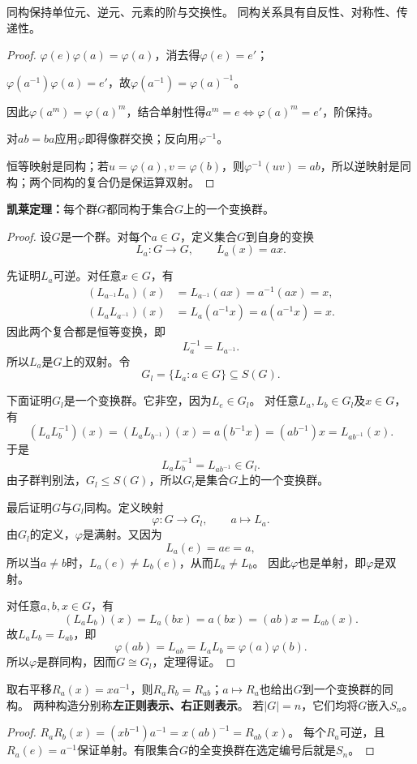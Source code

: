 \begin{proposition}
同构保持单位元、逆元、元素的阶与交换性。
同构关系具有自反性、对称性、传递性。
\end{proposition}
\begin{proof}
$\varphi(e)\varphi(a)=\varphi(a)$，消去得$\varphi(e)=e'$；

$\varphi(a^{-1})\varphi(a)=e'$，故$\varphi(a^{-1})=\varphi(a)^{-1}$。

因此$\varphi(a^m)=\varphi(a)^m$，结合单射性得$a^m=e\iff\varphi(a)^m=e'$，阶保持。

对$ab=ba$应用$\varphi$即得像群交换；反向用$\varphi^{-1}$。

恒等映射是同构；若$u=\varphi(a),v=\varphi(b)$，则$\varphi^{-1}(uv)=ab$，所以逆映射是同构；两个同构的复合仍是保运算双射。
\end{proof}
\begin{theorem}
\textbf{凯莱定理：}每个群$G$都同构于集合$G$上的一个变换群。
\end{theorem}
\begin{proof}
设$G$是一个群。对每个$a\in G$，定义集合$G$到自身的变换
\[
L_a:G\longrightarrow G,\qquad L_a(x)=ax.
\]

先证明$L_a$可逆。对任意$x\in G$，有
\[
\begin{aligned}
(L_{a^{-1}}L_a)(x)
&=L_{a^{-1}}(ax)
=a^{-1}(ax)
=x,\\
(L_aL_{a^{-1}})(x)
&=L_a(a^{-1}x)
=a(a^{-1}x)
=x.
\end{aligned}
\]
因此两个复合都是恒等变换，即
\[
L_a^{-1}=L_{a^{-1}}.
\]
所以$L_a$是$G$上的双射。令
\[
G_l=\{L_a:a\in G\}\subseteq S(G).
\]

下面证明$G_l$是一个变换群。它非空，因为$L_e\in G_l$。
对任意$L_a,L_b\in G_l$及$x\in G$，有
\[(L_aL_b^{-1})(x)
=(L_aL_{b^{-1}})(x)=a(b^{-1}x)=(ab^{-1})x=L_{ab^{-1}}(x).\]
于是
\[
L_aL_b^{-1}=L_{ab^{-1}}\in G_l.
\]
由子群判别法，$G_l\leq S(G)$，所以$G_l$是集合$G$上的一个变换群。

最后证明$G$与$G_l$同构。定义映射
\[
\varphi:G\longrightarrow G_l,\qquad a\longmapsto L_a.
\]
由$G_l$的定义，$\varphi$是满射。又因为
\[
L_a(e)=ae=a,
\]
所以当$a\neq b$时，$L_a(e)\neq L_b(e)$，从而$L_a\neq L_b$。
因此$\varphi$也是单射，即$\varphi$是双射。

对任意$a,b,x\in G$，有
\[(L_aL_b)(x)=L_a(bx)=a(bx)=(ab)x=L_{ab}(x).\]
故$L_aL_b=L_{ab}$，即
\[
\varphi(ab)=L_{ab}=L_aL_b=\varphi(a)\varphi(b).
\]
所以$\varphi$是群同构，因而$G\cong G_l$，定理得证。
\end{proof}

\begin{proposition}
取右平移$R_a(x)=xa^{-1}$，则$R_aR_b=R_{ab}$；$a\mapsto R_a$也给出$G$到一个变换群的同构。
两种构造分别称\textbf{左正则表示、右正则表示}。
若$|G|=n$，它们均将$G$嵌入$S_n$。
\end{proposition}
\begin{proof}
$R_aR_b(x)=(xb^{-1})a^{-1}=x(ab)^{-1}=R_{ab}(x)$。
每个$R_a$可逆，且$R_a(e)=a^{-1}$保证单射。有限集合$G$的全变换群在选定编号后就是$S_n$。
\end{proof}

